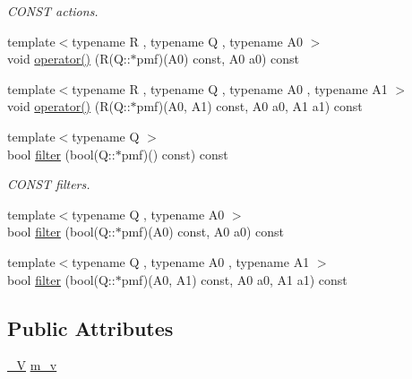 \begin{DoxyCompactItemize}
\begin{DoxyCompactList}\small\item\em CONST actions. \item\end{DoxyCompactList}\item 
{\footnotesize template$<$typename R , typename Q , typename A0 $>$ }\\void \hyperlink{class_d_d4hep_1_1_simulation_1_1_geant4_action_1_1_actors_a8726cbc282af42323025f943503cd670}{operator()} (R(Q::$\ast$pmf)(A0) const, A0 a0) const 
\item 
{\footnotesize template$<$typename R , typename Q , typename A0 , typename A1 $>$ }\\void \hyperlink{class_d_d4hep_1_1_simulation_1_1_geant4_action_1_1_actors_a1cceecd5397ed7a87468a0ccff4b4f01}{operator()} (R(Q::$\ast$pmf)(A0, A1) const, A0 a0, A1 a1) const 
\item 
{\footnotesize template$<$typename Q $>$ }\\bool \hyperlink{class_d_d4hep_1_1_simulation_1_1_geant4_action_1_1_actors_ad1e31731b8d00aa040573008fccf95d1}{filter} (bool(Q::$\ast$pmf)() const) const 
\begin{DoxyCompactList}\small\item\em CONST filters. \item\end{DoxyCompactList}\item 
{\footnotesize template$<$typename Q , typename A0 $>$ }\\bool \hyperlink{class_d_d4hep_1_1_simulation_1_1_geant4_action_1_1_actors_a964b1f489de666ec45209a4e9a580816}{filter} (bool(Q::$\ast$pmf)(A0) const, A0 a0) const 
\item 
{\footnotesize template$<$typename Q , typename A0 , typename A1 $>$ }\\bool \hyperlink{class_d_d4hep_1_1_simulation_1_1_geant4_action_1_1_actors_adcb471bd813492a95319bb67cc981d32}{filter} (bool(Q::$\ast$pmf)(A0, A1) const, A0 a0, A1 a1) const 
\end{DoxyCompactItemize}
\subsection*{Public Attributes}
\begin{DoxyCompactItemize}
\item 
\hyperlink{class_d_d4hep_1_1_simulation_1_1_geant4_action_1_1_actors_a18b6dfb1542a2cd036d8317db48f6c16}{\_\-V} \hyperlink{class_d_d4hep_1_1_simulation_1_1_geant4_action_1_1_actors_a9b46bb7156ab383291efa066fc23ce7d}{m\_\-v}
\end{DoxyCompactItemize}


